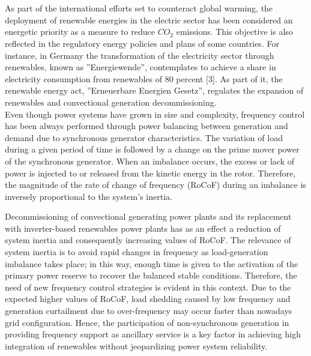  \section{}
  As part of the international efforts set to counteract global warming, the deployment of renewable energies in the electric sector has been considered an energetic priority as a measure to reduce $CO_{2}$ emissions. This objective is also reflected in the regulatory energy policies and plans of some countries. For instance, in Germany the transformation of the electricity sector through renewables, known as ''Energiewende”, contemplates to achieve a share in electricity consumption from renewables of 80 percent [3]. As part of it, the renewable energy act, ''Erneuerbare Energien Gesetz”, regulates the expansion of renewables and convectional generation decommissioning. \\
 
 Even though power systems have grown in size and complexity, frequency control has been always performed through power balancing between generation and demand due to synchronous generator characteristics. The variation of load during a given period of time is followed by a change on the prime mover power of the synchronous generator. When an imbalance occurs, the excess or lack of power is injected to or released from the kinetic energy in the rotor. Therefore, the magnitude of the rate of change of frequency (RoCoF) during an imbalance is inversely proportional to the system’s inertia. 
 
 Decommissioning of convectional generating power plants and its replacement with inverter-based renewables power plants has as an effect a reduction of system inertia and consequently increasing values of RoCoF. The relevance of system inertia is to avoid rapid changes in frequency as load-generation imbalance takes place; in this way, enough time is given to the activation of the primary power reserve to recover the balanced stable conditions. Therefore, the need of new frequency control strategies is evident in this context. Due to the expected higher values of RoCoF, load shedding caused by low frequency and generation curtailment due to over-frequency may occur faster than nowadays grid configuration. Hence, the participation of non-synchronous generation in providing frequency support as ancillary service is a key factor in achieving high integration of renewables without jeopardizing power system reliability. 
 
